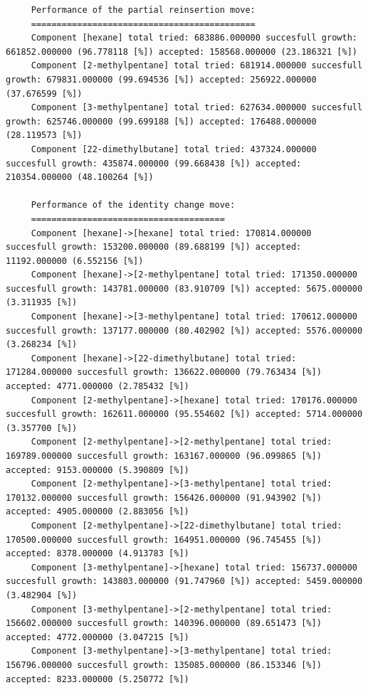 \begin{tiny}
\begin{verbatim}
     Performance of the partial reinsertion move:
     ============================================
     Component [hexane] total tried: 683886.000000 succesfull growth: 661852.000000 (96.778118 [%]) accepted: 158568.000000 (23.186321 [%])
     Component [2-methylpentane] total tried: 681914.000000 succesfull growth: 679831.000000 (99.694536 [%]) accepted: 256922.000000 (37.676599 [%])
     Component [3-methylpentane] total tried: 627634.000000 succesfull growth: 625746.000000 (99.699188 [%]) accepted: 176488.000000 (28.119573 [%])
     Component [22-dimethylbutane] total tried: 437324.000000 succesfull growth: 435874.000000 (99.668438 [%]) accepted: 210354.000000 (48.100264 [%])
     
     Performance of the identity change move:
     ======================================
     Component [hexane]->[hexane] total tried: 170814.000000 succesfull growth: 153200.000000 (89.688199 [%]) accepted: 11192.000000 (6.552156 [%])
     Component [hexane]->[2-methylpentane] total tried: 171350.000000 succesfull growth: 143781.000000 (83.910709 [%]) accepted: 5675.000000 (3.311935 [%])
     Component [hexane]->[3-methylpentane] total tried: 170612.000000 succesfull growth: 137177.000000 (80.402902 [%]) accepted: 5576.000000 (3.268234 [%])
     Component [hexane]->[22-dimethylbutane] total tried: 171284.000000 succesfull growth: 136622.000000 (79.763434 [%]) accepted: 4771.000000 (2.785432 [%])
     Component [2-methylpentane]->[hexane] total tried: 170176.000000 succesfull growth: 162611.000000 (95.554602 [%]) accepted: 5714.000000 (3.357700 [%])
     Component [2-methylpentane]->[2-methylpentane] total tried: 169789.000000 succesfull growth: 163167.000000 (96.099865 [%]) accepted: 9153.000000 (5.390809 [%])
     Component [2-methylpentane]->[3-methylpentane] total tried: 170132.000000 succesfull growth: 156426.000000 (91.943902 [%]) accepted: 4905.000000 (2.883056 [%])
     Component [2-methylpentane]->[22-dimethylbutane] total tried: 170500.000000 succesfull growth: 164951.000000 (96.745455 [%]) accepted: 8378.000000 (4.913783 [%])
     Component [3-methylpentane]->[hexane] total tried: 156737.000000 succesfull growth: 143803.000000 (91.747960 [%]) accepted: 5459.000000 (3.482904 [%])
     Component [3-methylpentane]->[2-methylpentane] total tried: 156602.000000 succesfull growth: 140396.000000 (89.651473 [%]) accepted: 4772.000000 (3.047215 [%])
     Component [3-methylpentane]->[3-methylpentane] total tried: 156796.000000 succesfull growth: 135085.000000 (86.153346 [%]) accepted: 8233.000000 (5.250772 [%])

\end{verbatim}
\end{tiny}
